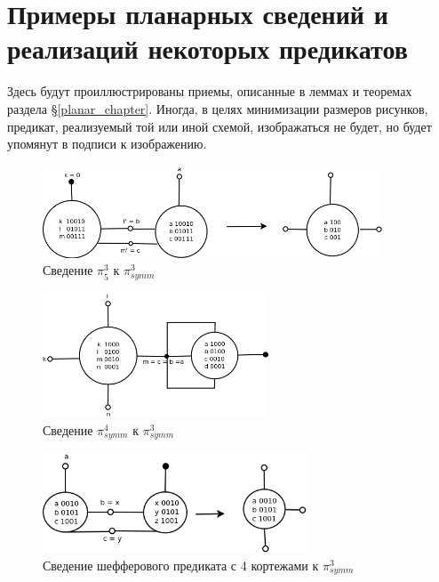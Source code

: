 \documentclass[12pt]{extarticle}
\begin{document}
\clearpage
\section{Примеры планарных сведений и реализаций некоторых предикатов}
Здесь будут проиллюстрированы приемы, описанные в леммах и теоремах раздела \S \ref{planar_chapter}. 
Иногда, в целях минимизации размеров рисунков, предикат, реализуемый той или иной схемой, изображаться не будет, 
но будет упомянут в подписи к изображению.

\begin{figure}[htb]
\centering
\includegraphics[width=0.9\textwidth]{3_2to3.png}
\caption{Сведение $\pi_5^3$ к $\pi_{symm}^3$ }
\label{fig:3_2to3}
\end{figure}

\begin{figure}[htb]
 \centering
\includegraphics[width=0.6\textwidth]{4to3.png}
\caption{Сведение $\pi_{symm}^4$ к $\pi_{symm}^3$ }
\label{fig:4to3}
\end{figure}

\begin{figure}[htb]
 \centering
\includegraphics[width=0.7\textwidth]{sch4.png}
\caption{Сведение шефферового предиката с 4 кортежами к $\pi_{symm}^3$ }
\label{fig:sheff4tosheff3}
\end{figure}
\end{document}
